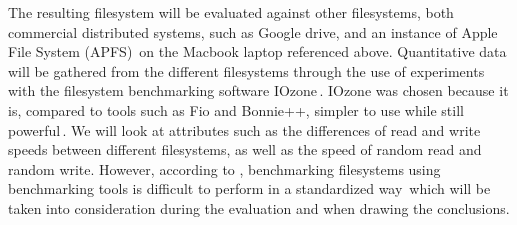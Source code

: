 The resulting filesystem will be evaluated against other filesystems, both commercial distributed systems, such as Google drive, and an instance of Apple File System (APFS)\,\cite{appleAppleFileSystem} on the Macbook laptop referenced above. Quantitative data will be gathered from the different filesystems through the use of experiments with the filesystem benchmarking software IOzone\,\cite{IozoneFilesystemBenchmark}. IOzone was chosen because it is, compared to tools such as Fio and Bonnie++, simpler to use while still powerful\,\cite{agarwalComparingIOBenchmarks2018}. We will look at attributes such as the differences of read and write speeds between different filesystems, as well as the speed of random read and random write. However, according to \citeauthor{tarasovBenchmarkingFileSystem2011}, benchmarking filesystems using benchmarking tools is difficult to perform in a standardized way\,\cite{tarasovBenchmarkingFileSystem2011} which will be taken into consideration during the evaluation and when drawing the conclusions.
